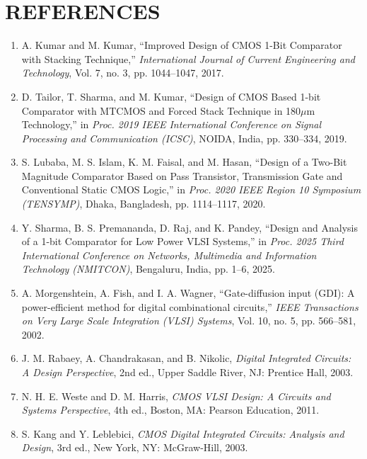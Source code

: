 \documentclass[12pt,a4paper,oneside]{report}
\begin{document}
\chapter*{REFERENCES}

\begin{enumerate}
\item[{[1]}] A. Kumar and M. Kumar, ``Improved Design of CMOS 1-Bit Comparator with Stacking Technique,'' \textit{International Journal of Current Engineering and Technology}, Vol. 7, no. 3, pp. 1044--1047, 2017.

\item[{[2]}] D. Tailor, T. Sharma, and M. Kumar, ``Design of CMOS Based 1-bit Comparator with MTCMOS and Forced Stack Technique in 180$\mu$m Technology,'' in \textit{Proc. 2019 IEEE International Conference on Signal Processing and Communication (ICSC)}, NOIDA, India, pp. 330--334, 2019.

\item[{[3]}] S. Lubaba, M. S. Islam, K. M. Faisal, and M. Hasan, ``Design of a Two-Bit Magnitude Comparator Based on Pass Transistor, Transmission Gate and Conventional Static CMOS Logic,'' in \textit{Proc. 2020 IEEE Region 10 Symposium (TENSYMP)}, Dhaka, Bangladesh, pp. 1114--1117, 2020.

\item[{[4]}] Y. Sharma, B. S. Premananda, D. Raj, and K. Pandey, ``Design and Analysis of a 1-bit Comparator for Low Power VLSI Systems,'' in \textit{Proc. 2025 Third International Conference on Networks, Multimedia and Information Technology (NMITCON)}, Bengaluru, India, pp. 1--6, 2025.

\item[{[5]}] A. Morgenshtein, A. Fish, and I. A. Wagner, ``Gate-diffusion input (GDI): A power-efficient method for digital combinational circuits,'' \textit{IEEE Transactions on Very Large Scale Integration (VLSI) Systems}, Vol. 10, no. 5, pp. 566--581, 2002.

\item[{[6]}] J. M. Rabaey, A. Chandrakasan, and B. Nikolic, \textit{Digital Integrated Circuits: A Design Perspective}, 2nd ed., Upper Saddle River, NJ: Prentice Hall, 2003.

\item[{[7]}] N. H. E. Weste and D. M. Harris, \textit{CMOS VLSI Design: A Circuits and Systems Perspective}, 4th ed., Boston, MA: Pearson Education, 2011.

\item[{[8]}] S. Kang and Y. Leblebici, \textit{CMOS Digital Integrated Circuits: Analysis and Design}, 3rd ed., New York, NY: McGraw-Hill, 2003.


\end{enumerate}
\end{document}
